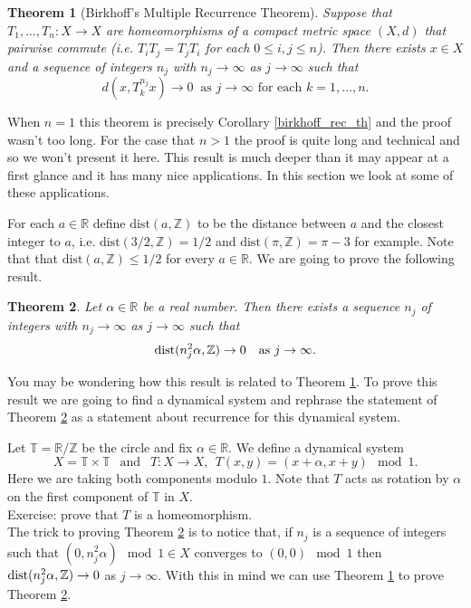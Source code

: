 \documentclass[12pt]{article}
\newtheorem{theorem}{Theorem}[section]
\theoremstyle{definition}
\theoremstyle{remark}
\begin{document}
\begin{theorem}[Birkhoff's Multiple Recurrence Theorem]\label{thm.bmr}
Suppose that $T_1, \ldots, T_n : X \to X$ are homeomorphisms of a compact metric space $(X,d)$ that pairwise commute (i.e. $T_iT_j = T_jT_i$ for each $0\le i,j \le n$). Then there exists $x\in X$ and a sequence of integers $n_j$ with $n_j \to \infty$ as $j\to\infty$ such that
\[
d(x,T_k^{n_j}x) \to 0 \ \text{ as $j \to \infty$ for each $k=1, \ldots, n$}.
\]
\end{theorem}
When $n =1$ this theorem is precisely Corollary \ref{birkhoff_rec_th} and the proof wasn't too long.  For the case that $n > 1$ the proof is quite long and technical and so we won't present it here.  This result is much deeper than it may appear at a first glance and it has many nice applications. In this section we look at some of these applications.

 For each $a \in \mathbb R$ define $\text{dist}(a, \mathbb{Z})$ to be the distance between $a$ and the closest integer to $a$, i.e. $\text{dist}(3/2, \mathbb{Z}) = 1/2$ and $\text{dist}(\pi,\mathbb{Z}) = \pi - 3$ for example.  Note that that $\text{dist}(a, \mathbb{Z}) \le 1/2$ for every $a\in\mathbb R$. We are going to prove the following result.

\begin{theorem}\label{thm.mrex}
Let $\alpha \in \mathbb{R}$ be a real number. Then there exists a sequence $n_j$ of integers with  $n_j \to \infty$ as $j\to\infty$ such that
\[
\textnormal{dist}(n_j^2\alpha, \mathbb{Z}) \to 0 \ \ \text{ as $j\to\infty$.}
\]
\end{theorem}
You may be wondering how this result is related to Theorem \ref{thm.bmr}. To prove this result we are going to find a dynamical system and rephrase the statement of Theorem \ref{thm.mrex} as a statement about recurrence for this dynamical system. 

Let $\mathbb T = \mathbb R/ \mathbb Z$ be the circle and fix $\alpha \in \mathbb{R}$. We define a dynamical system
\[
X = \mathbb T \times \mathbb T \ \ \text{ and } \ \ T: X \to X, \ \ T(x,y) = (x + \alpha, x + y) \mod 1.
\]
Here we are taking both components modulo $1$. Note that $T$ acts as rotation by $\alpha$ on the first component of $\mathbb T$ in $X$. \\

Exercise: prove that $T$ is a homeomorphism.\\

The trick to proving Theorem \ref{thm.mrex} is to notice that, if $n_j$ is a sequence of integers such that $(0,n_j^2\alpha) \mod 1 \in X$ converges to $(0,0) \mod 1$  then $\textnormal{dist}(n_j^2\alpha, \mathbb{Z}) \to 0 $ as $j \to\infty$. With this in mind we can use Theorem \ref{thm.bmr} to prove Theorem \ref{thm.mrex}.
\end{document}
